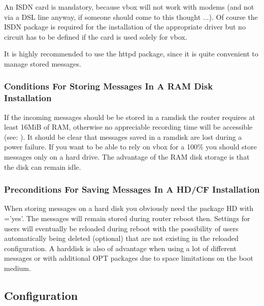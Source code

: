 An ISDN card is mandatory, because vbox will not work with modems
(and not via a DSL line anyway, if someone should come to this thought ...).
Of course the ISDN package is required for the installation of the appropriate driver
but no circuit has to be defined if the card is used solely for vbox.

It is highly recommended to use the httpd package, since it is quite convenient
to manage stored messages.


\subsubsection{Conditions For Storing Messages In A RAM Disk Installation}

If the incoming messages should be be stored in a ramdisk the router requires at least
16MiB of RAM, otherwise no appreciable recording time will be accessible (see: ).
It should be clear that messages saved in a ramdisk are lost during a power failure.
If you want to be able to rely on vbox for a 100\% you should store messages only
on a hard drive. The advantage of the RAM disk storage is that the disk can remain idle.

\subsubsection{Preconditions For Saving Messages In A HD/CF Installation}

When storing messages on a hard disk you obviously need the package HD with ='yes'.
The messages will remain stored during router reboot then. Settings for users will eventually
be reloaded during reboot with the possibility of users automatically being deleted (optional)
that are not existing in the reloaded configuration. A harddisk is also of advantage when using
a lot of different messages or with additional OPT packages due to space limitations on the boot
medium.

\subsection{Configuration}
